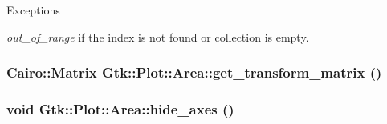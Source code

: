 \begin{DoxyExceptions}{Exceptions}
\item[{\em out\_\-of\_\-range}]if the index is not found or collection is empty. \end{DoxyExceptions}
\hypertarget{classGtk_1_1Plot_1_1Area_ae10eac569e8477756e0bdafdecdc4666}{
\subsubsection[{get\_\-transform\_\-matrix}]{\setlength{\rightskip}{0pt plus 5cm}Cairo::Matrix Gtk::Plot::Area::get\_\-transform\_\-matrix ()}}
\label{classGtk_1_1Plot_1_1Area_ae10eac569e8477756e0bdafdecdc4666}
\hypertarget{classGtk_1_1Plot_1_1Area_a20070fe099e163edfb8fb6c07526f4c3}{
\subsubsection[{hide\_\-axes}]{\setlength{\rightskip}{0pt plus 5cm}void Gtk::Plot::Area::hide\_\-axes ()}}
\label{classGtk_1_1Plot_1_1Area_a20070fe099e163edfb8fb6c07526f4c3}


